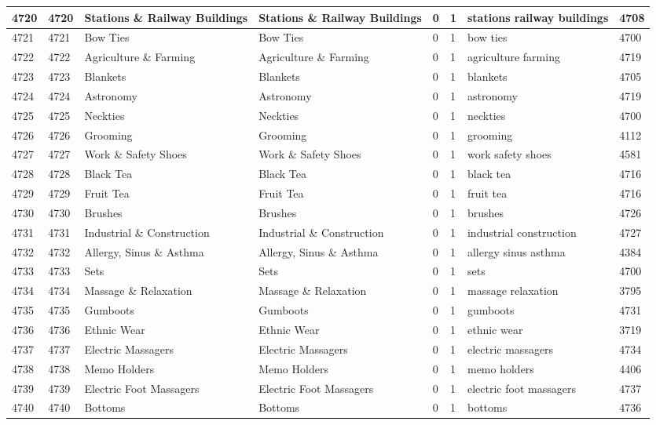 \begin{longtable}{|l|l|l|l|l|l|l|l|}
4720 & 4720 & Stations \& Railway Buildings & Stations \& Railway Buildings & 0 & 1 & stations railway buildings & 4708 \\ \hline 
4721 & 4721 & Bow Ties & Bow Ties & 0 & 1 & bow ties & 4700 \\ \hline 
4722 & 4722 & Agriculture \& Farming & Agriculture \& Farming & 0 & 1 & agriculture farming & 4719 \\ \hline 
4723 & 4723 & Blankets & Blankets & 0 & 1 & blankets & 4705 \\ \hline 
4724 & 4724 & Astronomy & Astronomy & 0 & 1 & astronomy & 4719 \\ \hline 
4725 & 4725 & Neckties & Neckties & 0 & 1 & neckties & 4700 \\ \hline 
4726 & 4726 & Grooming & Grooming & 0 & 1 & grooming & 4112 \\ \hline 
4727 & 4727 & Work \& Safety Shoes & Work \& Safety Shoes & 0 & 1 & work safety shoes & 4581 \\ \hline 
4728 & 4728 & Black Tea & Black Tea & 0 & 1 & black tea & 4716 \\ \hline 
4729 & 4729 & Fruit Tea & Fruit Tea & 0 & 1 & fruit tea & 4716 \\ \hline 
4730 & 4730 & Brushes & Brushes & 0 & 1 & brushes & 4726 \\ \hline 
4731 & 4731 & Industrial \& Construction & Industrial \& Construction & 0 & 1 & industrial construction & 4727 \\ \hline 
4732 & 4732 & Allergy, Sinus \& Asthma & Allergy, Sinus \& Asthma & 0 & 1 & allergy sinus asthma & 4384 \\ \hline 
4733 & 4733 & Sets & Sets & 0 & 1 & sets & 4700 \\ \hline 
4734 & 4734 & Massage \& Relaxation & Massage \& Relaxation & 0 & 1 & massage relaxation & 3795 \\ \hline 
4735 & 4735 & Gumboots & Gumboots & 0 & 1 & gumboots & 4731 \\ \hline 
4736 & 4736 & Ethnic Wear & Ethnic Wear & 0 & 1 & ethnic wear & 3719 \\ \hline 
4737 & 4737 & Electric Massagers & Electric Massagers & 0 & 1 & electric massagers & 4734 \\ \hline 
4738 & 4738 & Memo Holders & Memo Holders & 0 & 1 & memo holders & 4406 \\ \hline 
4739 & 4739 & Electric Foot Massagers & Electric Foot Massagers & 0 & 1 & electric foot massagers & 4737 \\ \hline 
4740 & 4740 & Bottoms & Bottoms & 0 & 1 & bottoms & 4736 \\ \hline 

\end{longtable}
